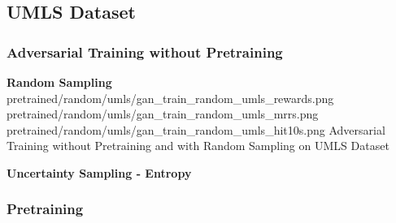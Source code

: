 \subsection{UMLS Dataset}


\subsubsection{Adversarial Training without Pretraining}

\textbf{Random Sampling}\\
%
{pretrained/random/umls/gan_train_random_umls_rewards.png}%
{pretrained/random/umls/gan_train_random_umls_mrrs.png}%
{pretrained/random/umls/gan_train_random_umls_hit10s.png}%
{Adversarial Training without Pretraining and with Random Sampling on \textsc{UMLS} Dataset}


\textbf{Uncertainty Sampling - Entropy}\\



\subsubsection{Pretraining}

